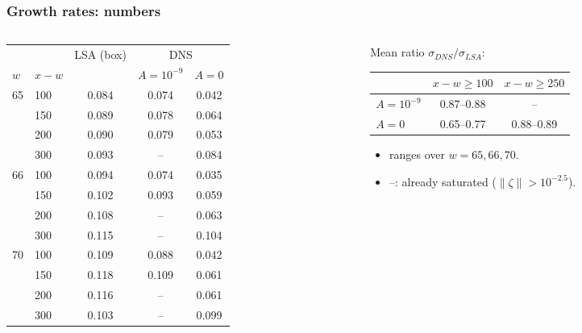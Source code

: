 \documentclass[
  aspectratio=169,
  t,
  onlytextwidth,
  10pt,
]{beamer}
\begin{document}
\begin{frame}
	\frametitle{Growth rates: numbers}
	\begin{columns}[T]
		\begin{column}{0.52\linewidth}
			\centering\footnotesize
			\renewcommand{\arraystretch}{0.95}
			\begin{tabular}{llccc}
				\toprule
				     &       & LSA (box) & \multicolumn{2}{c}{DNS} \\
				\cmidrule(lr){4-5}
				$w$  & $x-w$ &           & $A=10^{-9}$ & $A=0$ \\
				\midrule
				\multirow{4}{*}{65} & 100 & 0.084 & 0.074 & 0.042 \\
				                    & 150 & 0.089 & 0.078 & 0.064 \\
				                    & 200 & 0.090 & 0.079 & 0.053 \\
				                    & 300 & 0.093 & --    & 0.084 \\
				\midrule
				\multirow{4}{*}{66} & 100 & 0.094 & 0.074 & 0.035 \\
				                    & 150 & 0.102 & 0.093 & 0.059 \\
				                    & 200 & 0.108 & --    & 0.063 \\
				                    & 300 & 0.115 & --    & 0.104 \\
				\midrule
				\multirow{4}{*}{70} & 100 & 0.109 & 0.088 & 0.042 \\
				                    & 150 & 0.118 & 0.109 & 0.061 \\
				                    & 200 & 0.116 & --    & 0.061 \\
				                    & 300 & 0.103 & --    & 0.099 \\
				\bottomrule
			\end{tabular}
		\end{column}
		\begin{column}{0.46\linewidth}
			\small
			Mean ratio $\sigma_{DNS}/\sigma_{LSA}$:
			\vspace{0.1cm}

			\renewcommand{\arraystretch}{1.1}
			\begin{tabular}{lcc}
				\toprule
				         & $x-w\geq100$ & $x-w\geq250$ \\
				\midrule
				$A=10^{-9}$ & 0.87--0.88 & --  \\
				$A=0$       & 0.65--0.77 & 0.88--0.89 \\
				\bottomrule
			\end{tabular}
			\begin{itemize}
				\item ranges over $w=65,66,70$.
				\item --: already saturated ($\|\zeta\|>10^{-2.5}$).
			\end{itemize}
		\end{column}
	\end{columns}
\end{frame}
\end{document}

